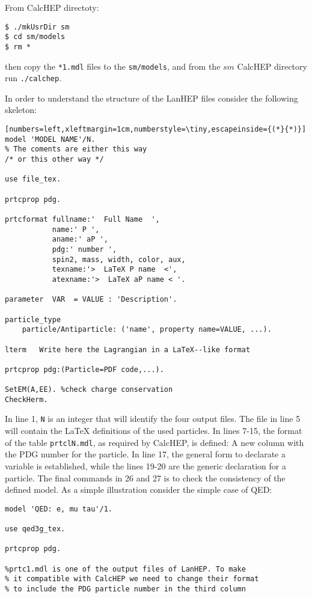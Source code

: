 \begin{frame}{}
From CalcHEP directoty:
\begin{lstlisting}
$ ./mkUsrDir sm
$ cd sm/models
$ rm * 
\end{lstlisting}
then copy the \lstinline{*1.mdl} files to the \lstinline{sm/models}, and from the $sm$ CalcHEP directory run \lstinline{./calchep}.

In order to understand the structure of the LanHEP files consider the following skeleton:
\begin{lstlisting}[numbers=left,xleftmargin=1cm,numberstyle=\tiny,escapeinside={(*}{*)}]
model 'MODEL NAME'/N.
% The coments are either this way
/* or this other way */

use file_tex.

prtcprop pdg.

prtcformat fullname:'  Full Name  ',
           name:' P ',
           aname:' aP ',
           pdg:' number ',
           spin2, mass, width, color, aux,
           texname:'>  LaTeX P name  <',
           atexname:'>  LaTeX aP name < '.

parameter  VAR  = VALUE : 'Description'.

particle_type  
	particle/Antiparticle: ('name', property name=VALUE, ...).

lterm  	Write here the Lagrangian in a LaTeX--like format

prtcprop pdg:(Particle=PDF code,...).

SetEM(A,EE). %check charge conservation
CheckHerm.
\end{lstlisting}
In line 1, \lstinline{N} is an integer that will identify the four output files. The file in line 5 will contain the \LaTeX{} definitions of the used particles. In lines 7-15, the format of the table \lstinline{prtclN.mdl}, as required by CalcHEP, is defined: A new column with the PDG number for the particle.  In line 17, the general form to declarate a variable is established, while the lines 19-20 are the generic declaration for a particle. The final commands in 26 and 27 is to check the consistency of the defined model. 
As a simple illustration consider the simple case of QED:
\begin{lstlisting}
model 'QED: e, mu tau'/1.

use qed3g_tex.

prtcprop pdg.

%prtc1.mdl is one of the output files of LanHEP. To make
% it compatible with CalcHEP we need to change their format
% to include the PDG particle number in the third column
 

\end{lstlisting}
\end{frame}
